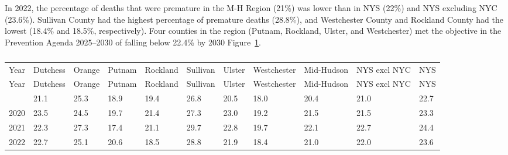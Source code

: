 \documentclass[
  english,
  letterpaper,
]{report}
\begin{document}
In 2022, the percentage of deaths that were premature in the M-H Region
(21\%) was lower than in NYS (22\%) and NYS excluding NYC (23.6\%).
Sullivan County had the highest percentage of premature deaths (28.8\%),
and Westchester County and Rockland County had the lowest (18.4\% and
18.5\%, respectively). Four counties in the region (Putnam, Rockland,
Ulster, and Westchester) met the objective in the Prevention Agenda
2025--2030 of falling below 22.4\% by 2030
Figure~\ref{fig-premature-death-percent}.

\begin{figure}


\caption{\label{fig-premature-death-percent}}

\end{figure}%

\begin{longtable}[]{@{}lllllllllll@{}}

\caption{\label{tbl-premature-death-percent}Percentage of Deaths That
are Premature, 2019--2022}

\tabularnewline

\caption{}\label{T_3d84e}\tabularnewline
\toprule\noalign{}
Year & Dutchess & Orange & Putnam & Rockland & Sullivan & Ulster &
Westchester & Mid-Hudson & NYS excl NYC & NYS \\
\midrule\noalign{}
\endfirsthead
\toprule\noalign{}
Year & Dutchess & Orange & Putnam & Rockland & Sullivan & Ulster &
Westchester & Mid-Hudson & NYS excl NYC & NYS \\
\midrule\noalign{}
\endhead
\bottomrule\noalign{}
\endlastfoot
2019 & 21.1 & 25.3 & 18.9 & 19.4 & 26.8 & 20.5 & 18.0 & 20.4 & 21.0 &
22.7 \\
2020 & 23.5 & 24.5 & 19.7 & 21.4 & 27.3 & 23.0 & 19.2 & 21.5 & 21.5 &
23.3 \\
2021 & 22.3 & 27.3 & 17.4 & 21.1 & 29.7 & 22.8 & 19.7 & 22.1 & 22.7 &
24.4 \\
2022 & 22.7 & 25.1 & 20.6 & 18.5 & 28.8 & 21.9 & 18.4 & 21.0 & 22.0 &
23.6 \\

\end{longtable}
\end{document}
